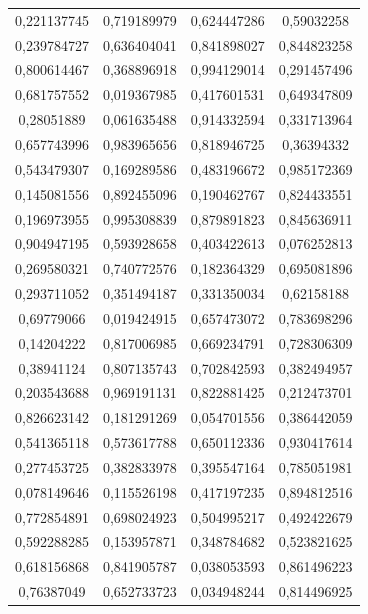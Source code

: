 \documentclass[a4paper, 12pt]{article}
\begin{document}
\begin{longtable}{|c|c|c|c|}
    0,221137745 & 0,719189979 & 0,624447286 & 0,59032258 \\
    0,239784727 & 0,636404041 & 0,841898027 & 0,844823258 \\
    0,800614467 & 0,368896918 & 0,994129014 & 0,291457496 \\
    0,681757552 & 0,019367985 & 0,417601531 & 0,649347809 \\
    0,28051889 & 0,061635488 & 0,914332594 & 0,331713964 \\
    0,657743996 & 0,983965656 & 0,818946725 & 0,36394332 \\
    0,543479307 & 0,169289586 & 0,483196672 & 0,985172369 \\
    0,145081556 & 0,892455096 & 0,190462767 & 0,824433551 \\
    0,196973955 & 0,995308839 & 0,879891823 & 0,845636911 \\
    0,904947195 & 0,593928658 & 0,403422613 & 0,076252813 \\
    0,269580321 & 0,740772576 & 0,182364329 & 0,695081896 \\
    0,293711052 & 0,351494187 & 0,331350034 & 0,62158188 \\
    0,69779066 & 0,019424915 & 0,657473072 & 0,783698296 \\
    0,14204222 & 0,817006985 & 0,669234791 & 0,728306309 \\
    0,38941124 & 0,807135743 & 0,702842593 & 0,382494957 \\
    0,203543688 & 0,969191131 & 0,822881425 & 0,212473701 \\
    0,826623142 & 0,181291269 & 0,054701556 & 0,386442059 \\
    0,541365118 & 0,573617788 & 0,650112336 & 0,930417614 \\
    0,277453725 & 0,382833978 & 0,395547164 & 0,785051981 \\
    0,078149646 & 0,115526198 & 0,417197235 & 0,894812516 \\
    0,772854891 & 0,698024923 & 0,504995217 & 0,492422679 \\
    0,592288285 & 0,153957871 & 0,348784682 & 0,523821625 \\
    0,618156868 & 0,841905787 & 0,038053593 & 0,861496223 \\
    0,76387049 & 0,652733723 & 0,034948244 & 0,814496925 \\
\end{longtable}
\end{document}
